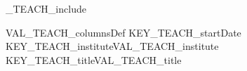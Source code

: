 %
\ifVAL_TEACH_include %
\begin{myTableEnv}{VAL_TEACH_columnsDef}%
    \myRow%
        {KEY_TEACH_startDate}{}%
        {KEY_TEACH_institute}{VAL_TEACH_institute}%
    \myRow%
        {KEY_TEACH_title}{VAL_TEACH_title}%
        {}{}%
    
\end{myTableEnv}%
%
\fi%
%